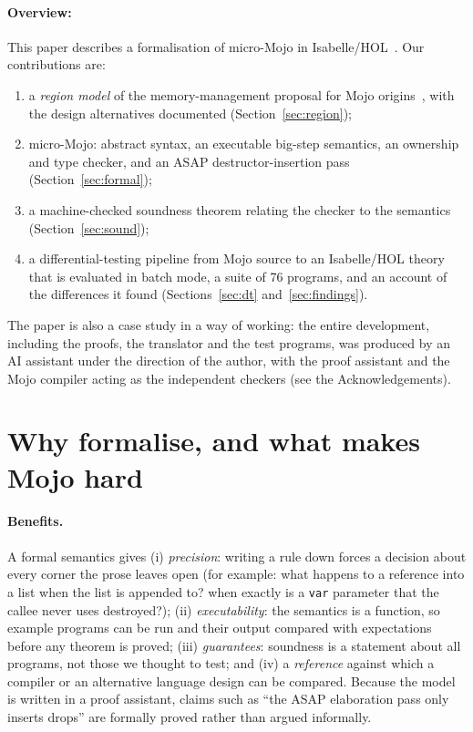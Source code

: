 \documentclass[11pt,a4paper]{article}
\newcommand{\micro}{micro-Mojo}
\newcommand{\IHOL}{Isabelle/HOL}
\newcommand{\code}[1]{\texttt{#1}}
\begin{document}
\paragraph{Overview:}
This paper describes a formalisation of micro-Mojo in \IHOL{}~\cite{isabelle}.
Our contributions are:
\begin{enumerate}
\item a \emph{region model} of the memory-management proposal for Mojo
  origins~\cite{smith-gist}, with the design alternatives documented
  (Section~\ref{sec:region});
\item \micro{}: abstract syntax, an executable big-step semantics, an ownership
  and type checker, and an ASAP destructor-insertion pass (Section~\ref{sec:formal});
\item a machine-checked soundness theorem relating the checker to the semantics
  (Section~\ref{sec:sound});
\item a differential-testing pipeline from Mojo source to an \IHOL{} theory that is
  evaluated in batch mode, a suite of 76 programs, and an account of the
  differences it found (Sections~\ref{sec:dt} and~\ref{sec:findings}).
\end{enumerate}

The paper is also a case study in a way of working: the entire development,
including the proofs, the translator and the test programs, was produced by an
AI assistant under the direction of the author, with the proof assistant and
the Mojo compiler acting as the independent checkers (see the
Acknowledgements).

\section{Why formalise, and what makes Mojo hard}

\paragraph{Benefits.}
A formal semantics gives (i) \emph{precision}: writing a rule down forces a
decision about every corner the prose leaves open (for example: what happens to
a reference into a list when the list is appended to? when exactly is a
\code{var} parameter that the callee never uses destroyed?); (ii)
\emph{executability}: the semantics is a function, so example programs can be
run and their output compared with expectations before any theorem is proved;
(iii) \emph{guarantees}: soundness is a statement about all programs, not those
we thought to test; and (iv) a \emph{reference} against which a compiler or an
alternative language design can be compared. Because the model is written in a
proof assistant, claims such as ``the ASAP elaboration pass only inserts drops'' are
formally proved rather than argued informally.
\end{document}
